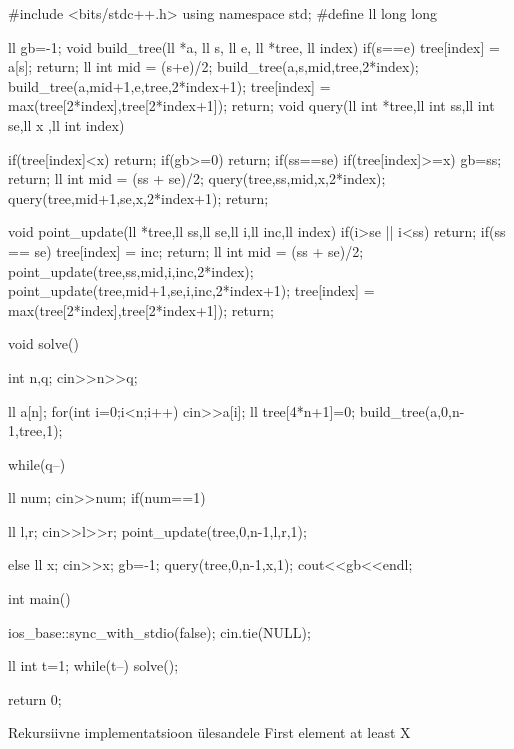 \documentclass{trkut}
\begin{document}
\begin{cclol}
#include <bits/stdc++.h>
using namespace std;
#define ll long long

ll gb=-1;
void build_tree(ll *a, ll s, ll e, ll *tree, ll index)
{
	if(s==e)
	{
		tree[index] = a[s];
		return;
	}
	ll int mid = (s+e)/2;
	build_tree(a,s,mid,tree,2*index);
	build_tree(a,mid+1,e,tree,2*index+1);
	tree[index] = max(tree[2*index],tree[2*index+1]);
	return;
}
void query(ll int *tree,ll int ss,ll int se,ll x ,ll int index)
{
	
	if(tree[index]<x)
	return;
	if(gb>=0)
	return;
	if(ss==se)
	{
		if(tree[index]>=x)
		gb=ss;
		return;
	}
	ll int mid = (ss + se)/2;
	 query(tree,ss,mid,x,2*index);
	 query(tree,mid+1,se,x,2*index+1);
	 return;
}
void point_update(ll *tree,ll ss,ll se,ll i,ll inc,ll index)
{
	if(i>se || i<ss)
	return;
	if(ss == se)
	{
		tree[index] = inc;
		return;
	}
	ll int mid = (ss + se)/2;
	point_update(tree,ss,mid,i,inc,2*index);
	point_update(tree,mid+1,se,i,inc,2*index+1);
	tree[index] = max(tree[2*index],tree[2*index+1]);
	return;
}

void solve()
{
	int n,q;
	cin>>n>>q;
	
	ll a[n];
	for(int i=0;i<n;i++)
	cin>>a[i];
	ll tree[4*n+1]={0};
	build_tree(a,0,n-1,tree,1);

	while(q--)
	{
		ll num;
		cin>>num;
		if(num==1)
		{
			ll l,r;
			cin>>l>>r;
			point_update(tree,0,n-1,l,r,1);
			
		}
		else
		{
			ll x;
			cin>>x;
			gb=-1;
			query(tree,0,n-1,x,1);
			cout<<gb<<endl;
		}
		
	}

}
int main()
{
	ios_base::sync_with_stdio(false); 
    	cin.tie(NULL); 
  
    ll int t=1;
	while(t--)
	{  
      solve();
    }

	return 0;
}
\end{cclol}
\begin{kk}[H]%
    \caption{Rekursiivne implementatsioon ülesandele First element at least X}%
    \label{EMaxx}%
    \end{kk}
\end{document}
